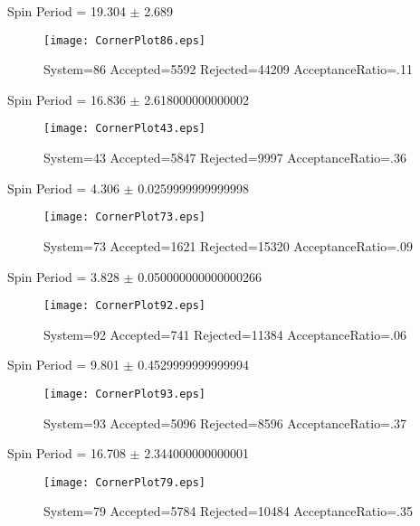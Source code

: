 \documentclass[10pt]{article}
\begin{document}
\newpage
\begin{center}
        Spin Period = 19.304 $\pm$ 2.689
        \end{center}
\begin{figure}[H] 
        \texttt{[image: CornerPlot86.eps]}
        \caption{System=86 Accepted=5592 Rejected=44209 AcceptanceRatio=.11}
        \label{S86}
        \centering
        \end{figure}
\newpage
\begin{center}
        Spin Period = 16.836 $\pm$ 2.618000000000002
        \end{center}
\begin{figure}[H] 
        \texttt{[image: CornerPlot43.eps]}
        \caption{System=43 Accepted=5847 Rejected=9997 AcceptanceRatio=.36}
        \label{S43}
        \centering
        \end{figure}
\newpage
\begin{center}
        Spin Period = 4.306 $\pm$ 0.0259999999999998
        \end{center}
\begin{figure}[H] 
        \texttt{[image: CornerPlot73.eps]}
        \caption{System=73 Accepted=1621 Rejected=15320 AcceptanceRatio=.09}
        \label{S73}
        \centering
        \end{figure}
\newpage
\begin{center}
        Spin Period = 3.828 $\pm$ 0.050000000000000266
        \end{center}
\begin{figure}[H] 
        \texttt{[image: CornerPlot92.eps]}
        \caption{System=92 Accepted=741 Rejected=11384 AcceptanceRatio=.06}
        \label{S92}
        \centering
        \end{figure}
\newpage
\begin{center}
        Spin Period = 9.801 $\pm$ 0.4529999999999994
        \end{center}
\begin{figure}[H] 
        \texttt{[image: CornerPlot93.eps]}
        \caption{System=93 Accepted=5096 Rejected=8596 AcceptanceRatio=.37}
        \label{S93}
        \centering
        \end{figure}
\newpage
\begin{center}
        Spin Period = 16.708 $\pm$ 2.344000000000001
        \end{center}
\begin{figure}[H] 
        \texttt{[image: CornerPlot79.eps]}
        \caption{System=79 Accepted=5784 Rejected=10484 AcceptanceRatio=.35}
        \label{S79}
        \centering
        \end{figure}
\end{document}
